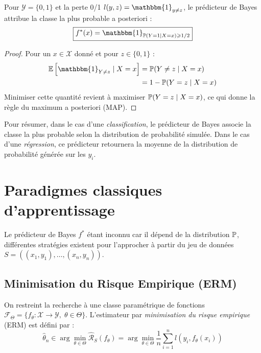 \begin{proposition}
    Pour $\mathcal{Y} = \{0, 1\}$ et la perte 0/1 $l(y, z) = \mathbbm{1}_{y \neq z}$, le prédicteur de Bayes attribue la classe la plus probable a posteriori :
    \begin{equation}
        \boxed{f^*(x) = \mathbbm{1}_{\myP(Y = 1 \mid X = x) \geqslant 1/2}}
    \end{equation}
\end{proposition}

\begin{proof}
    Pour un $x \in \mathcal{X}$ donné et pour $z \in \{0, 1\}$ :
    \begin{align*}
        \mathbb{E}\left[\mathbbm{1}_{Y \neq z} \mid X = x\right] &= \myP(Y \neq z \mid X = x) \\
        &= 1 - \myP(Y = z \mid X = x)
    \end{align*}
    Minimiser cette quantité revient à maximiser $\mathbb{P}(Y = z \mid X = x)$, ce qui donne la règle du maximum a posteriori (MAP).
\end{proof}

Pour résumer, dans le cas d'une \emph{classification}, le prédicteur de Bayes associe la classe la plus probable selon la distribution de probabilité simulée. 
Dans le cas d'une \emph{régression}, ce prédicteur retournera la moyenne de la distribution de probabilité générée sur les $y_i$. 



\section{Paradigmes classiques d'apprentissage}

Le prédicteur de Bayes $f^*$ étant inconnu car il dépend de la distribution $\mathbb{P}$, différentes stratégies existent pour l'approcher à partir du jeu de données $S = ((x_1, y_1), \dots, (x_n, y_n))$.

\subsection{Minimisation du Risque Empirique (ERM)}

\begin{definition}
    On restreint la recherche à une classe paramétrique de fonctions $\mathcal{F}_\Theta = \{f_\theta : \mathcal{X} \to \mathcal{Y}, \; \theta \in \Theta\}$. L'estimateur par \emph{minimisation du risque empirique} (ERM) est défini par :
    \begin{equation}
        \boxed{\hat{\theta}_n \in \arg \min_{\theta \in \Theta} \hat{\mathcal{R}}_S(f_\theta) = \arg \min_{\theta \in \Theta} \frac{1}{n} \sum_{i=1}^n l(y_i, f_\theta(x_i))}
    \end{equation}
\end{definition}


